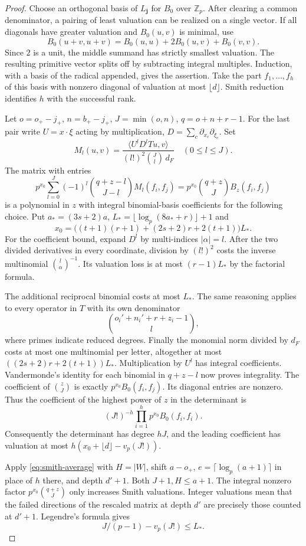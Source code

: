 \begin{proof}
Choose an orthogonal basis of \(L_{\mathbf j}\) for \(B_0\) over
\(\mathbb Z_p\). After clearing a common denominator, a pairing
of least valuation can be realized on a single vector. If all
diagonals have greater valuation and \(B_0(u,v)\) is minimal,
use
\[
 B_0(u+v,u+v)=B_0(u,u)+2B_0(u,v)+B_0(v,v).
\]
Since \(2\) is a unit, the middle summand has strictly smallest valuation. The resulting
primitive vector splits off by subtracting integral multiples.
Induction, with a basis of the radical appended, gives the
assertion. Take the part \(f_1,\ldots,f_h\) of this basis with
nonzero diagonal of valuation at most \(\lfloor d\rfloor\).
Smith reduction identifies \(h\) with the successful rank.

Let \(o=o_+-j_+\), \(n=b_+-j_+\), \(J=\min(o,n)\),
\(q=o+n+r-1\). For the last pair write \(U=x\cdot\xi\) acting
by multiplication, \(D=\sum_c\partial_{x_c}\partial_{\xi_c}\).
Set
\[
 M_l(u,v)=
 \frac{\langle U^lD^l Tu,v\rangle}{(l!)^2\binom Jl\,d_F}\quad(0\le l\le J).
\]
The matrix with entries
\[
 p^{x_0}\sum_{l=0}^J(-1)^l
       \binom{q+z-l}{J-l} M_l(f_i,f_j)
   =p^{x_0}\binom{q+z}{J}B_z(f_i,f_j)
\]
is a polynomial in \(z\) with integral binomial-basis
coefficients for the following choice. Put \(a_*=(3s+2)a\),
\(L_*=\lfloor\log_p(8a_*+r)\rfloor+1\) and
\[
 x_0=\big((t+1)(r+1)+(2s+2)r+2(t+1)\big)L_* .
\]
For the coefficient bound, expand \(D^l\) by multi-indices
\(|\alpha|=l\). After the two divided derivatives in every
coordinate, division by \((l!)^2\) costs the inverse multinomial
\(\binom l\alpha^{-1}\). Its valuation loss is at most
\((r-1)L_*\) by the factorial formula.

The additional reciprocal
binomial costs at most \(L_*\). The same reasoning applies to
every operator in \(T\) with its own denominator
\[
 \binom{o_i'+n_i'+r+z_i-1}{l},
\]
where primes indicate
reduced degrees. Finally the monomial norm divided by \(d_F\)
costs at most one multinomial per letter, altogether at most
\(((2s+2)r+2(t+1))L_*\). Multiplication by \(U^l\) has integral
coefficients. Vandermonde's identity for each binomial in
\(q+z-l\) now proves integrality. The coefficient of \(\binom zJ\)
is exactly \(p^{x_0}B_0(f_i,f_j)\). Its diagonal entries are nonzero. Thus the coefficient of the highest power of \(z\) in the determinant is
\[
 (J!)^{-h}\prod_{i=1}^h p^{x_0} B_0(f_i,f_i).
\]
Consequently the determinant has degree \(hJ\), and the
leading coefficient has valuation at most
\(h(x_0+\lfloor d\rfloor-v_p(J!))\).

Apply \eqref{eq:smith-average} with \(H=|W|\), shift \(a-o_+\),
\(e=\lceil\log_p(a+1)\rceil\) in place of \(h\) there, and depth
\(d'+1\). Both \(J+1,H\le a+1\).
The integral nonzero factor \(p^{x_0}\binom{q+z}{J}\) only
increases Smith valuations. Integer valuations mean that the
failed directions of the rescaled matrix at depth \(d'\) are
precisely those counted at \(d'+1\).
Legendre's formula gives
\[
 J/(p-1)-v_p(J!)\le L_*.
\]


\end{proof}
